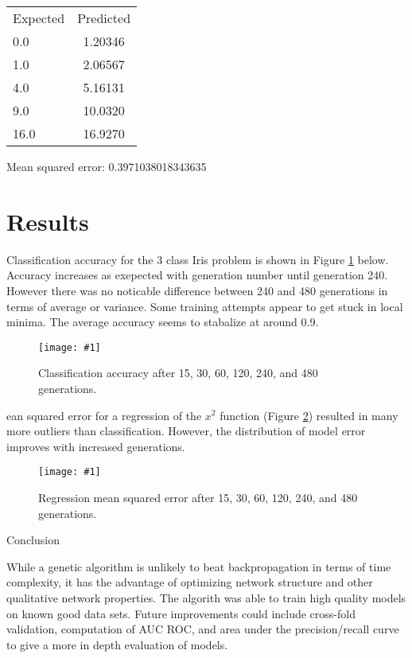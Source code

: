 \documentclass[twocolumn]{article}
\newcommand\fig[5]{
	\begin{figure}[H]
		\begin{center}\texttt{[image: \#1]}\end{center}
		\caption{#4}\label{fig:#2}
	\end{figure}
}
\newcommand\figRef[1]{Figure \ref{fig:#1}\xspace}
\begin{document}
\begin{center}
\begin{tabular}{ l c }
Expected & Predicted \\
0.0 & 1.20346 \\
1.0 & 2.06567 \\
4.0 & 5.16131 \\
9.0 & 10.0320 \\
16.0 & 16.9270
\end{tabular}
\end{center}

Mean squared error: 0.3971038018343635

\section{Results}

Classification accuracy for the 3 class Iris problem is shown in \figRef{classificationBenchmark} below. Accuracy increases as exepected with generation number until generation 240. However there was no noticable difference between 240 and 480 generations in terms of average or variance. Some training attempts appear to get stuck in local minima. The average accuracy seems to stabalize at around 0.9.

\fig{images/AccuracyByGeneration.png}{classificationBenchmark}{0.45}{
Classification accuracy after 15, 30, 60, 120, 240, and 480 generations.
}

Mean squared error for a regression of the $x^2$ function (\figRef{regressionBenchmark}) resulted in many more outliers than classification. However, the distribution of model error improves with increased generations.

\fig{images/ErrorByGeneration.png}{regressionBenchmark}{0.45}{
Regression mean squared error after 15, 30, 60, 120, 240, and 480 generations.
}

\section{Conclusion}

While a genetic algorithm is unlikely to beat backpropagation in terms of time complexity, it has the advantage of optimizing network structure and other qualitative network properties. The algorith was able to train high quality models on known good data sets. Future improvements could include cross-fold validation, computation of AUC ROC, and area under the precision/recall curve to give a more in depth evaluation of models. 

\printbibliography
\end{document}
